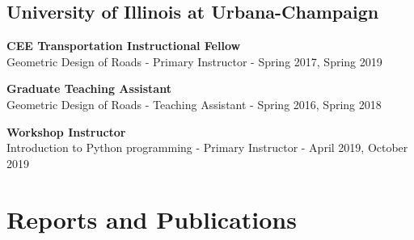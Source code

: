 \documentclass[12pt]{article}
\begin{document}
\hfill
\subsection*{University of Illinois at Urbana-Champaign}
\textbf{CEE Transportation Instructional Fellow}\\
Geometric Design of Roads - Primary Instructor - Spring 2017, Spring 2019

\textbf{Graduate Teaching Assistant}\\
Geometric Design of Roads - Teaching Assistant - Spring 2016, Spring 2018

\textbf{Workshop Instructor}\\
Introduction to Python programming - Primary Instructor - April 2019, October 2019


\bigskip
\section*{Reports and Publications}
\hfill
\end{document}
